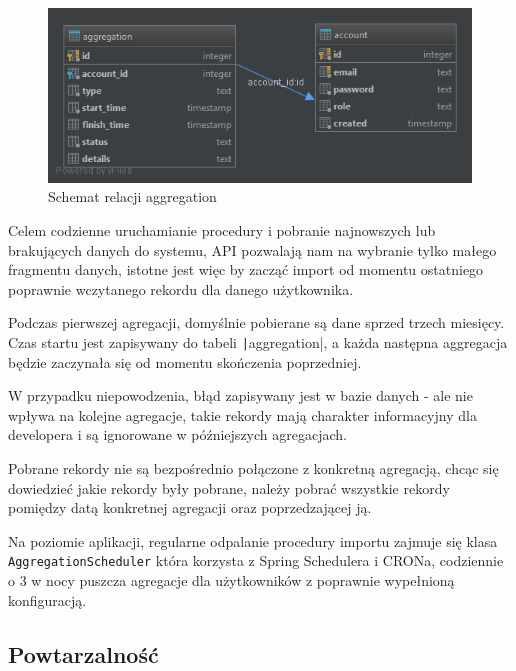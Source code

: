 \documentclass[openright]{xmgr}
\begin{document}
            \begin{figure}
                \centering
                \includegraphics[width=\textwidth]{fig/db-aggregation.png}
                \caption{Schemat relacji aggregation}
                \label{fig:db-aggregation}
            \end{figure}

            Celem codzienne uruchamianie procedury i pobranie najnowszych lub brakujących danych do systemu,
            API pozwalają nam na wybranie tylko małego fragmentu danych, istotne jest więc by zacząć import
            od momentu ostatniego poprawnie wczytanego rekordu dla danego użytkownika.

            Podczas pierwszej agregacji, domyślnie pobierane są dane sprzed trzech miesięcy.
            Czas startu jest zapisywany do tabeli \texttt|aggregation|,
            a każda następna aggregacja będzie zaczynała się od momentu skończenia poprzedniej.

            W przypadku niepowodzenia, błąd zapisywany jest w bazie danych - ale nie wpływa na kolejne agregacje,
            takie rekordy mają charakter informacyjny dla developera i są ignorowane w późniejszych agregacjach.

            Pobrane rekordy nie są bezpośrednio połączone z konkretną agregacją,
            chcąc się dowiedzieć jakie rekordy były pobrane, należy pobrać wszystkie rekordy pomiędzy datą konkretnej agregacji oraz poprzedzającej ją.

            Na poziomie aplikacji, regularne odpalanie procedury importu zajmuje się klasa \texttt{AggregationScheduler}
            która korzysta z Spring Schedulera i CRONa, codziennie o 3 w nocy puszcza agregacje dla użytkowników z poprawnie wypełnioną konfiguracją.

        \subsection*{Powtarzalność}
\end{document}
